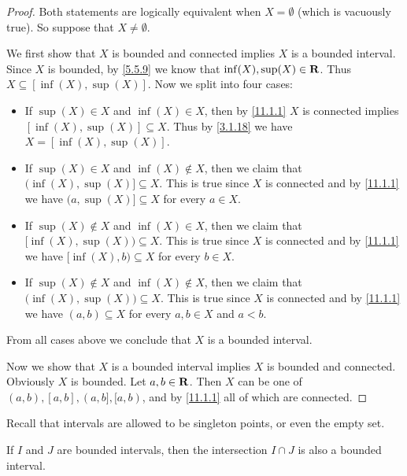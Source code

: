 \begin{proof}
  Both statements are logically equivalent when \(X = \emptyset\) (which is vacuously true).
  So suppose that \(X \neq \emptyset\).

  We first show that \(X\) is bounded and connected implies \(X\) is a bounded interval.
  Since \(X\) is bounded, by \cref{5.5.9} we know that \(\inf(X), \sup(X) \in \mathbf{R}\).
  Thus \(X \subseteq [\inf(X), \sup(X)]\).
  Now we split into four cases:
  \begin{itemize}
    \item If \(\sup(X) \in X\) and \(\inf(X) \in X\), then by \cref{11.1.1} \(X\) is connected implies \([\inf(X), \sup(X)] \subseteq X\).
          Thus by \cref{3.1.18} we have \(X = [\inf(X), \sup(X)]\).
    \item If \(\sup(X) \in X\) and \(\inf(X) \notin X\), then we claim that \(\big(\inf(X), \sup(X)] \subseteq X\).
          This is true since \(X\) is connected and by \cref{11.1.1} we have \(\big(a, \sup(X)] \subseteq X\) for every \(a \in X\).
    \item If \(\sup(X) \notin X\) and \(\inf(X) \in X\), then we claim that \([\inf(X), \sup(X)\big) \subseteq X\).
          This is true since \(X\) is connected and by \cref{11.1.1} we have \([\inf(X), b\big) \subseteq X\) for every \(b \in X\).
    \item If \(\sup(X) \notin X\) and \(\inf(X) \notin X\), then we claim that \(\big(\inf(X), \sup(X)\big) \subseteq X\).
          This is true since \(X\) is connected and by \cref{11.1.1} we have \((a, b) \subseteq X\) for every \(a, b \in X\) and \(a < b\).
  \end{itemize}
  From all cases above we conclude that \(X\) is a bounded interval.

  Now we show that \(X\) is a bounded interval implies \(X\) is bounded and connected.
  Obviously \(X\) is bounded.
  Let \(a, b \in \mathbf{R}\).
  Then \(X\) can be one of \((a, b), [a, b], (a, b], [a, b)\), and by \cref{11.1.1} all of which are connected.
\end{proof}

\begin{remark}\label{11.1.5}
  Recall that intervals are allowed to be singleton points, or even the empty set.
\end{remark}

\begin{corollary}\label{11.1.6}
  If \(I\) and \(J\) are bounded intervals, then the intersection \(I \cap J\) is also a bounded interval.
\end{corollary}

